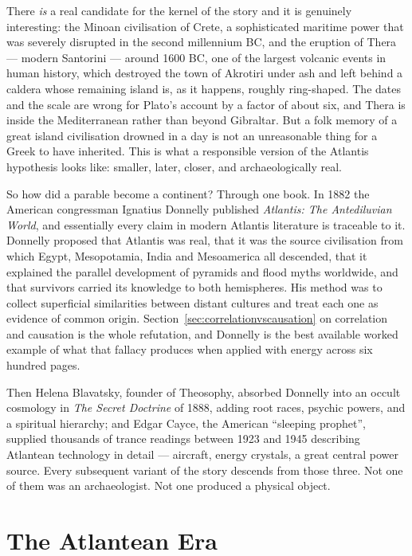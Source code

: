 \begin{funfact}
There \emph{is} a real candidate for the kernel of the story and it is genuinely interesting: the
Minoan civilisation of Crete, a sophisticated maritime power that was severely disrupted in the
second millennium BC, and the eruption of Thera --- modern Santorini --- around 1600 BC, one of the
largest volcanic events in human history, which destroyed the town of Akrotiri under ash and left
behind a caldera whose remaining island is, as it happens, roughly ring-shaped. The dates and the
scale are wrong for Plato's account by a factor of about six, and Thera is inside the Mediterranean
rather than beyond Gibraltar. But a folk memory of a great island civilisation drowned in a day is
not an unreasonable thing for a Greek to have inherited. This is what a responsible version of the
Atlantis hypothesis looks like: smaller, later, closer, and archaeologically real.
\end{funfact}

So how did a parable become a continent? Through one book. In 1882 the American congressman Ignatius
Donnelly published \emph{Atlantis: The Antediluvian World}, and essentially every claim in modern
Atlantis literature is traceable to it. Donnelly proposed that Atlantis was real, that it was the
source civilisation from which Egypt, Mesopotamia, India and Mesoamerica all descended, that it
explained the parallel development of pyramids and flood myths worldwide, and that survivors carried
its knowledge to both hemispheres. His method was to collect superficial similarities between distant
cultures and treat each one as evidence of common origin. Section~\ref{sec:correlationvscausation} on correlation and causation is
the whole refutation, and Donnelly is the best available worked example of what that fallacy produces
when applied with energy across six hundred pages.

Then Helena Blavatsky, founder of Theosophy, absorbed Donnelly into an occult cosmology in \emph{The
Secret Doctrine} of 1888, adding root races, psychic powers, and a spiritual hierarchy; and Edgar
Cayce, the American ``sleeping prophet'', supplied thousands of trance readings between 1923 and 1945
describing Atlantean technology in detail --- aircraft, energy crystals, a great central power
source. Every subsequent variant of the story descends from those three. Not one of them was an
archaeologist. Not one produced a physical object.

\section{The Atlantean Era}\label{sec:atlanteanera}

